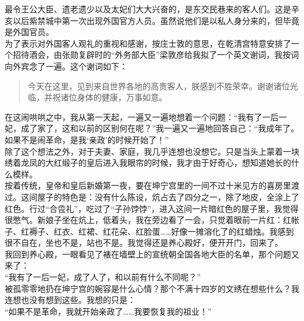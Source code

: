 最令王公大臣、遗老遗少以及太妃们大大兴奋的，是东交民巷来的客人们。这是辛亥以后紫禁城中第一次出现外国官方人员。虽然说他们是以私人身分来的，但毕竟是外国官员。\\

为了表示对外国客人观礼的重视和感谢，按庄士敦的意思，在乾清宫特意安排了一个招待酒会，由张勋复辟时的“外务部大臣”梁敦彦给我拟了一个英文谢词，我按词向外宾念了一遍。这个谢词如下：\\

\begin{quote}
	今天在这里，见到来自世界各地的高贵客人，朕感到不胜荣幸。谢谢诸位光临，并祝诸位身体的健康，万事如意。
\end{quote}

在这闹哄哄之中，我从第一天起，一遍又一遍地想着一个问题：“我有了一后一妃，成了家了，这和以前的区别何在呢？”我一遍又一遍地回答自己：“我成年了。如果不是闹革命，是我‘亲政’的时候开始了！”\\

除了这个想法之外，对于夫妻、家庭，我几乎连想也没想它。只是当头上蒙着一块绣着龙凤的大红缎子的皇后进入我眼帘的时候，我才由于好奇心，想知道她长的什么模样。\\

按着传统，皇帝和皇后新婚第一夜，要在坤宁宫里的一间不过十米见方的喜房里渡过。这间屋子的特色是：没有什么陈设，炕占去了四分之一，除了地皮，全涂上了红色。行过“合卺礼”，吃过了“子孙饽饽”，进入这间一片暗红色的屋子里，我觉得很憋气。新娘子坐在炕上，低着头，我在旁边看了一会，只觉着眼前一片红：红帐子、红褥子、红衣、红裙、红花朵、红脸蛋……好像一摊溶化了的红蜡烛。我感到很不自在，坐也不是，站也不是。我觉得还是养心殿好，便开开门，回来了。\\

我回到养心殿，一眼看见了裱在墙壁上的宣统朝全国各地大臣的名单，那个问题又来了：\\

“我有了一后一妃，成了人了，和以前有什么不同呢？”\\

被孤零零地扔在坤宁宫的婉容是什么心情？那个不满十四岁的文绣在想些什么？我连想也没有想到这些。我想的只是：\\

“如果不是革命，我就开始亲政了……我要恢复我的祖业！”\\